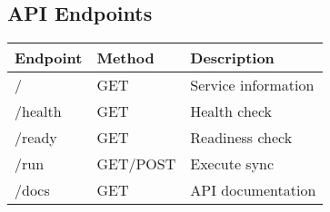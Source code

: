 \documentclass[11pt,a4paper]{article}
\begin{document}
\subsection{API Endpoints}
\begin{tabular}{lll}
\toprule
\textbf{Endpoint} & \textbf{Method} & \textbf{Description} \\
\midrule
/ & GET & Service information \\
/health & GET & Health check \\
/ready & GET & Readiness check \\
/run & GET/POST & Execute sync \\
/docs & GET & API documentation \\
\bottomrule
\end{tabular}
\end{document}
